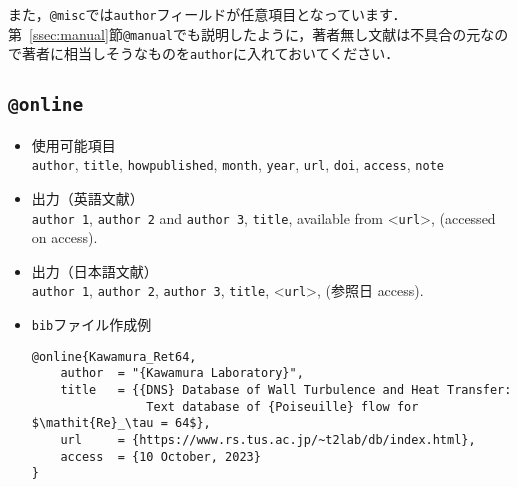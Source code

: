 \documentclass[a4paper,fleqn,uplatex,dvipdfmx]{jsarticle}
\makeatletter
\newcommand{\ttmanual}{\texttt{@manual}}
\newcommand{\ttmisc}{\texttt{@misc}}
\newcommand{\ttonline}{\texttt{@online}}
\makeatother
\begin{document}
また，\ttmisc では\verb|author|フィールドが任意項目となっています．
第~\ref{ssec:manual}節\ttmanual でも説明したように，著者無し文献は不具合の元なので著者に相当しそうなものを\verb|author|に入れておいてください．

\subsection{\ttonline}
\label{ssec:online}
\begin{screen}
    \begin{itemize}
        \item 使用可能項目 \\
        \verb|author|, \verb|title|, \verb|howpublished|, \verb|month|, \verb|year|, \verb|url|, \verb|doi|, \verb|access|, \verb|note|
        \item 出力（英語文献） \\
            \colorbox[gray]{0.8}{\texttt{author 1}}, \colorbox[gray]{0.8}{\texttt{author 2}} and \colorbox[gray]{0.8}{\texttt{author 3}}, \colorbox[gray]{0.8}{\texttt{title}}, available from \textless\colorbox[gray]{0.8}{\texttt{url}}\textgreater, (accessed on \colorbox[gray]{0.8}{access}).
        \item 出力（日本語文献） \\
            \colorbox[gray]{0.8}{\texttt{author 1}}, \colorbox[gray]{0.8}{\texttt{author 2}}, \colorbox[gray]{0.8}{\texttt{author 3}}, \colorbox[gray]{0.8}{\texttt{title}}, \textless\colorbox[gray]{0.8}{\texttt{url}}\textgreater, (参照日 \colorbox[gray]{0.8}{access}).
        \item \verb|bib|ファイル作成例 \vspace{-3mm}
\begin{verbatim}
@online{Kawamura_Ret64,
    author  = "{Kawamura Laboratory}",
    title   = {{DNS} Database of Wall Turbulence and Heat Transfer: 
                Text database of {Poiseuille} flow for $\mathit{Re}_\tau = 64$},
    url     = {https://www.rs.tus.ac.jp/~t2lab/db/index.html},
    access  = {10 October, 2023}
}
\end{verbatim}
    \end{itemize}
\end{screen}
\end{document}
